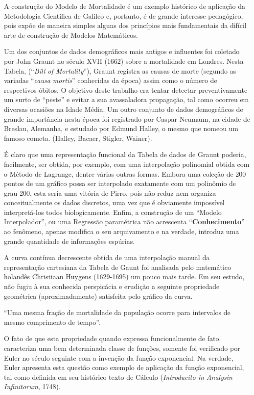     A construção do Modelo de Mortalidade é um exemplo histórico de aplicação da Metodologia Cientifica de Galileo e, portanto, é de grande interesse pedagógico, pois expõe de maneira simples alguns dos princípios mais fundamentais da difícil arte de construção de Modelos Matemáticos.

    Um dos conjuntos de dados demográficos mais antigos e influentes foi coletado por John Graunt no século XVII (1662) sobre a mortalidade em Londres. Nesta Tabela, (``\textit{Bill of Mortality}''), Graunt registra as causas de morte (segundo as variadas ``\textit{causa mortis}'' conhecidas da época) assim como o número de respectivos óbitos. O objetivo deste trabalho era tentar detectar preventivamente um surto de ``peste'' e evitar a sua avassaladora propagação, tal como ocorreu em diversas ocasiões na Idade Média. Um outro conjunto de dados demográficos de grande importância nesta época foi registrado por Caspar Neumann, na cidade de Breslau, Alemanha, e estudado por Edmund Halley, o mesmo que nomeou um famoso cometa. (Halley, Bacaer, Stigler, Wainer).

    É claro que uma representação funcional da Tabela de dados de Graunt poderia, facilmente, ser obtida, por exemplo, com uma interpolação polinomial obtida com o Método de Lagrange, dentre várias outras formas. Embora uma coleção de 200 pontos de um gráfico possa ser interpolado exatamente com um polinômio de grau 200, esta seria uma vitória de Pirro, pois não reduz nem organiza conceitualmente os dados discretos, uma vez que é obviamente impossível interpretá-los todos biologicamente. Enfim, a construção de um ``Modelo Interpolador'', ou uma Regressão paramétrica não acrescenta ``\textbf{Conhecimento}'' ao fenômeno, apenas modifica o seu arquivamento e na verdade, introduz uma grande quantidade de informações espúrias.

    A curva contínua decrescente obtida de uma interpolação manual da representação cartesiana da Tabela de Gaunt foi analisada pelo matemático holandês Christiaan Huygens (1629-1695) um pouco mais tarde. Em seu estudo, não fugiu à sua conhecida perspicácia e erudição a seguinte propriedade geométrica (aproximadamente) satisfeita pelo gráfico da curva.

\begin{remark}
``Uma mesma fração de mortalidade da população ocorre para intervalos de mesmo comprimento de tempo''.
\end{remark}

    O fato de que esta propriedade quando expressa funcionalmente de fato caracteriza uma bem determinada classe de funções, somente foi verificado por Euler no século seguinte com a invenção da função exponencial. Na verdade, Euler apresenta esta questão como exemplo de aplicação da função exponencial, tal como definida em seu histórico texto de Cálculo (\textit{Introducito in Analysin Infinitorum}, 1748).

